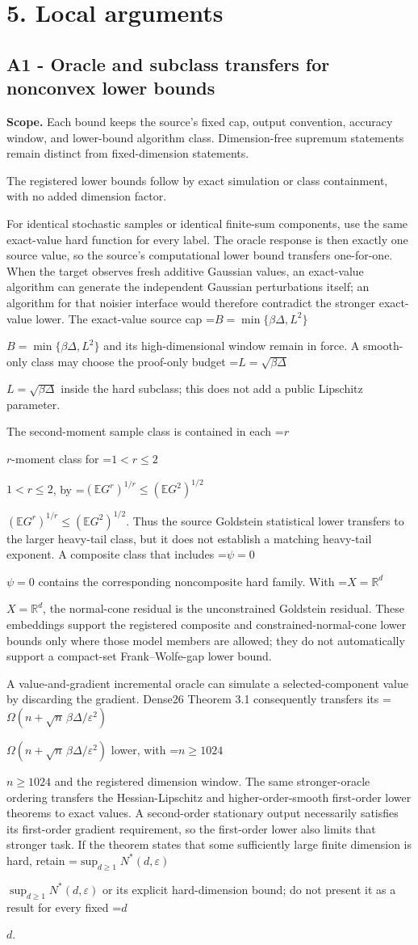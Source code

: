 \documentclass[10pt,a4paper]{article}
\newcommand{\AtlasMath}[1]{\par\begingroup\centering\setbox0=\hbox{$\displaystyle #1$}\ifdim\wd0>1.4\linewidth\typeout{ATLAS WIDE FORMULA: \the\wd0}\fi\ifdim\wd0>\linewidth\resizebox{\linewidth}{!}{\box0}\else\box0\fi\par\endgroup}
\newcommand{\AtlasInlineMath}[1]{\begingroup\setbox0=\hbox{$#1$}\ifdim\wd0>.4\linewidth\endgroup\AtlasMath{#1}\else\endgroup$#1$\fi}
\begin{document}
\section{5. Local arguments}
\subsection{A1 - Oracle and subclass transfers for nonconvex lower bounds}
\textbf{Scope.} Each bound keeps the source's fixed cap, output convention, accuracy window, and lower-bound algorithm class. Dimension-free supremum statements remain distinct from fixed-dimension statements.

The registered lower bounds follow by exact simulation or class containment, with no added dimension factor.

For identical stochastic samples or identical finite-sum components, use the same exact-value hard function for every label. The oracle response is then exactly one source value, so the source's computational lower bound transfers one-for-one. When the target observes fresh additive Gaussian values, an exact-value algorithm can generate the independent Gaussian perturbations itself; an algorithm for that noisier interface would therefore contradict the stronger exact-value lower. The exact-value source cap \AtlasInlineMath{B=\min\{\beta\Delta,L^2\}} and its high-dimensional window remain in force. A smooth-only class may choose the proof-only budget \AtlasInlineMath{L=\sqrt{\beta\Delta}} inside the hard subclass; this does not add a public Lipschitz parameter.

The second-moment sample class is contained in each \AtlasInlineMath{r}-moment class for \AtlasInlineMath{1<r\le2}, by \AtlasInlineMath{(\mathbb EG^r)^{1/r}\le(\mathbb EG^2)^{1/2}}. Thus the source Goldstein statistical lower transfers to the larger heavy-tail class, but it does not establish a matching heavy-tail exponent. A composite class that includes \AtlasInlineMath{\psi=0} contains the corresponding noncomposite hard family. With \AtlasInlineMath{X=\mathbb R^d}, the normal-cone residual is the unconstrained Goldstein residual. These embeddings support the registered composite and constrained-normal-cone lower bounds only where those model members are allowed; they do not automatically support a compact-set Frank--Wolfe-gap lower bound.

A value-and-gradient incremental oracle can simulate a selected-component value by discarding the gradient. Dense26 Theorem 3.1 consequently transfers its \AtlasInlineMath{\Omega(n+\sqrt n\,\beta\Delta/\varepsilon^2)} lower, with \AtlasInlineMath{n\ge1024} and the registered dimension window. The same stronger-oracle ordering transfers the Hessian-Lipschitz and higher-order-smooth first-order lower theorems to exact values. A second-order stationary output necessarily satisfies its first-order gradient requirement, so the first-order lower also limits that stronger task. If the theorem states that some sufficiently large finite dimension is hard, retain \AtlasInlineMath{\sup_{d\ge1}N^*(d,\varepsilon)} or its explicit hard-dimension bound; do not present it as a result for every fixed \AtlasInlineMath{d}.
\end{document}
